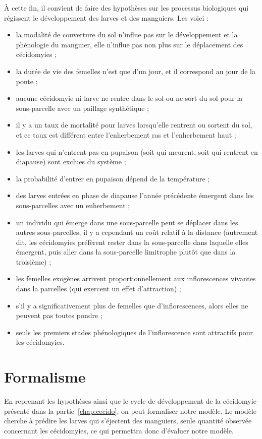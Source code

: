 À cette fin, il convient de faire des hypothèses sur les processus biologiques qui régissent le développement des larves et des manguiers.
Les voici :
\begin{itemize}
 \item la modalité de couverture du sol n'influe pas sur le développement et la phénologie du manguier, elle n'influe pas non plus sur le déplacement des cécidomyies ;
 \item la durée de vie des femelles n'est que d'un jour, et il correspond au jour de la ponte ;
 \item aucune cécidomyie ni larve ne rentre dans le sol ou ne sort du sol pour la sous-parcelle avec un paillage synthétique ;
 \item il y a un taux de mortalité pour larves lorsqu'elle rentrent ou sortent du sol, et ce taux est différent entre l'enherbement ras et l'enherbement haut ;
 \item les larves qui n'entrent pas en pupaison (soit qui meurent, soit qui rentrent en diapause) sont exclues du système ;
 \item la probabilité d'entrer en pupaison dépend de la température ;
 \item des larves entrées en phase de diapause l'année précédente émergent dans les sous-parcelles avec un enherbement ;
 \item un individu qui émerge dans une sous-parcelle peut se déplacer dans les autres sous-parcelles, il y a cependant un coût relatif à la distance (autrement dit, les cécidomyies préfèrent rester dans la sous-parcelle dans laquelle elles émergent, puis aller dans la sous-parcelle limitrophe plutôt que dans la troisième) ;
 \item les femelles exogènes arrivent proportionnellement aux inflorescences vivantes dans la parcelles (qui exercent un effet d'attraction) ;
 \item s'il y a significativement plus de femelles que d'inflorescences, alors elles ne peuvent pas toutes pondre ;
 \item  seuls les premiers stades phénologiques de l'inflorescence sont attractifs pour les cécidomyies.
\end{itemize}



\section{Formalisme}

En reprenant les hypothèses ainsi que le cycle de développement de la cécidomyie présenté dans la partie~\ref{chap:cecido}, on peut formaliser notre modèle.
Le modèle cherche à prédire les larves qui s'éjectent des manguiers, seule quantité observée concernant les cécidomyies, ce qui permettra donc d'évaluer notre modèle.

